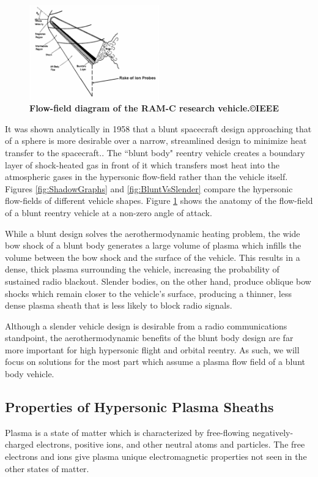 \documentclass[twocolumn]{article}
\begin{document}
\begin{figure}
	\centering
	\includegraphics[width=0.5\textwidth]{Images/RAMC_FlowField.png}
	\caption{\textbf{Flow-field diagram of the RAM-C research vehicle.\cite{rybak_causes_1970}\copyright IEEE}}
	\label{fig:RAMCFlowField}
\end{figure}

It was shown analytically in 1958 that a blunt spacecraft design approaching that of a sphere is more desirable over a narrow, streamlined design to minimize heat transfer to the spacecraft.\cite{allen_study_1958}.
The ``blunt body" reentry vehicle creates a boundary layer of shock-heated gas in front of it which transfers most heat into the atmospheric gases in the hypersonic flow-field rather than the vehicle itself.
Figures \ref{fig:ShadowGraphs} and \ref{fig:BluntVsSlender} compare the hypersonic flow-fields of different vehicle shapes.
Figure \ref{fig:RAMCFlowField} shows the anatomy of the flow-field of a blunt reentry vehicle at a non-zero angle of attack.

While a blunt design solves the aerothermodynamic heating problem, the wide bow shock of a blunt body generates a large volume of plasma which infills the volume between the bow shock and the surface of the vehicle.
This results in a dense, thick plasma surrounding the vehicle, increasing the probability of sustained radio blackout.
Slender bodies, on the other hand, produce oblique bow shocks which remain closer to the vehicle's surface, producing a thinner, less dense plasma sheath that is less likely to block radio signals.\cite{hartunian_implications_2007}

Although a slender vehicle design is desirable from a radio communications standpoint, the aerothermodynamic benefits of the blunt body design are far more important for high hypersonic flight and orbital reentry.
As such, we will focus on solutions for the most part which assume a plasma flow field of a blunt body vehicle.


\subsection*{Properties of Hypersonic Plasma Sheaths}
Plasma is a state of matter which is characterized by free-flowing negatively-charged electrons, positive ions, and other neutral atoms and particles.
The free electrons and ions give plasma unique electromagnetic properties not seen in the other states of matter.
\end{document}
